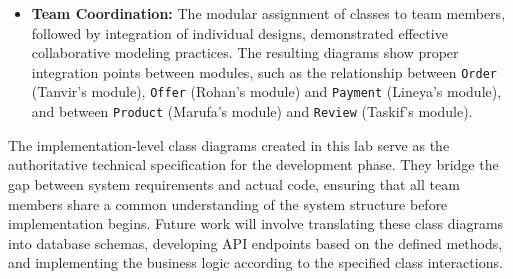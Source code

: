 \begin{itemize}
    \item \textbf{Team Coordination:} The modular assignment of classes to team members, followed by integration of individual designs, demonstrated effective collaborative modeling practices. The resulting diagrams show proper integration points between modules, such as the relationship between \texttt{Order} (Tanvir's module), \texttt{Offer} (Rohan's module) and \texttt{Payment} (Lineya's module), and between \texttt{Product} (Marufa's module) and \texttt{Review} (Taskif's module).
\end{itemize}

The implementation-level class diagrams created in this lab serve as the authoritative technical specification for the development phase. They bridge the gap between system requirements and actual code, ensuring that all team members share a common understanding of the system structure before implementation begins. Future work will involve translating these class diagrams into database schemas, developing API endpoints based on the defined methods, and implementing the business logic according to the specified class interactions.